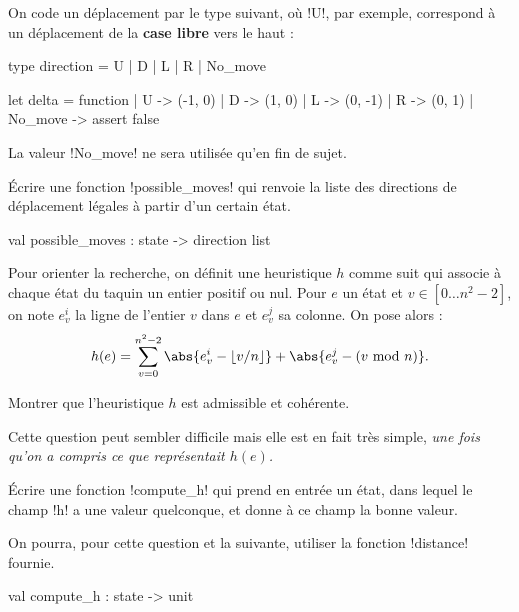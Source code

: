 On code un déplacement par le type suivant, où \ml!U!, par exemple,
correspond à un déplacement de la \textbf{case libre} vers le haut :
\begin{ocaml}
type direction = U | D | L | R | No_move

let delta = function
  | U -> (-1, 0)
  | D -> (1, 0)
  | L -> (0, -1)
  | R -> (0, 1)
  | No_move -> assert false
\end{ocaml}

\begin{rem}
  La valeur \ml!No_move! ne sera utilisée qu'en fin de sujet.
\end{rem}

\begin{ques}
  Écrire une fonction \ml!possible_moves! qui renvoie la liste
  des directions de déplacement légales à partir d'un certain état.
\begin{ocaml}
val possible_moves : state -> direction list
\end{ocaml}
\end{ques}

Pour orienter la recherche, on définit une heuristique $h$ comme suit qui
associe à chaque état du taquin un entier positif ou nul.
Pour $e$ un état et $v \in [0\dots n^{2} - 2]$, on note $e_{v}^{i}$
la ligne de l'entier $v$ dans $e$ et $e_{v}^{j}$ sa colonne.
On pose alors :
\begin{displaymath}
  h(e)
  = \sum_{v = 0}^{n^{2} - 2} \abs{e_v^i - \left\lfloor v/n \right\rfloor}
    + \abs{e_v^j - (v \textnormal{ mod } n)}.
\end{displaymath}

\begin{ques}
  Montrer que l'heuristique $h$ est admissible et cohérente.
  \begin{rem}
    Cette question peut sembler difficile mais elle est en fait très
    simple, \emph{une fois qu'on a compris ce que représentait $h(e)$.}
  \end{rem}
\end{ques}


\begin{ques}
  Écrire une fonction \ml!compute_h! qui prend en entrée un état,
  dans lequel le champ \ml!h! a une valeur quelconque, et donne à ce
  champ la bonne valeur.
  \begin{rem}
    On pourra, pour cette question et la suivante, utiliser la
    fonction \ml!distance! fournie.
  \end{rem}
\begin{ocaml}
val compute_h : state -> unit
\end{ocaml}
\end{ques}

